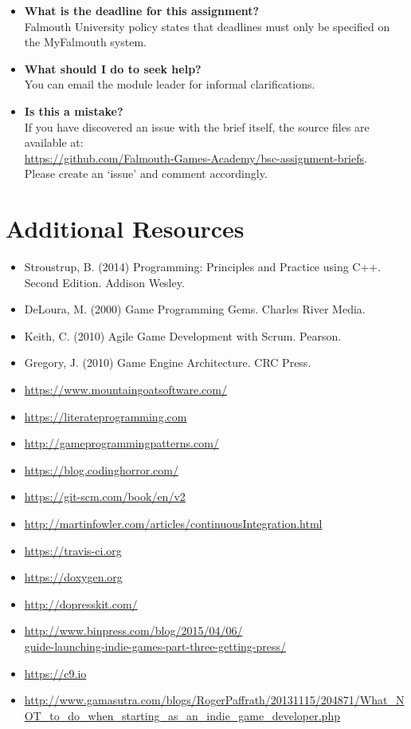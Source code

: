 \documentclass{../../fal_assignment}
\begin{document}
\begin{itemize}
	\item 	\textbf{What is the deadline for this assignment?} \\ 
    		Falmouth University policy states that deadlines must only be specified on the MyFalmouth system.
    		
	\item 	\textbf{What should I do to seek help?} \\ 
    		You can email the module leader for informal clarifications. 
    		
    	\item 	\textbf{Is this a mistake?} \\ 	
    		If you have discovered an issue with the brief itself, the source files are available at: \\
    		\url{https://github.com/Falmouth-Games-Academy/bsc-assignment-briefs}.\\
    		 Please create an `issue' and comment accordingly.
\end{itemize}

\section*{Additional Resources}

\begin{itemize}
    \item Stroustrup, B. (2014) Programming: Principles and Practice using C++. Second Edition. Addison Wesley.
    \item DeLoura, M. (2000) Game Programming Gems. Charles River Media.
    \item Keith, C. (2010) Agile Game Development with Scrum. Pearson.
    \item Gregory, J. (2010) Game Engine Architecture. CRC Press.
    \item \url{https://www.mountaingoatsoftware.com/}
    \item \url{https://literateprogramming.com}
    \item \url{http://gameprogrammingpatterns.com/}
    \item \url{https://blog.codinghorror.com/}
    \item \url{https://git-scm.com/book/en/v2}
    \item \url{http://martinfowler.com/articles/continuousIntegration.html}
    \item \url{https://travis-ci.org}
    \item \url{https://doxygen.org}
    \item \url{http://dopresskit.com/}
    \item \url{http://www.binpress.com/blog/2015/04/06/}\\ \url{guide-launching-indie-games-part-three-getting-press/}
    \item \url{https://c9.io}
    \item \url{http://www.gamasutra.com/blogs/RogerPaffrath/20131115/204871/What_NOT_to_do_when_starting_as_an_indie_game_developer.php}
\end{itemize}
\end{document}
